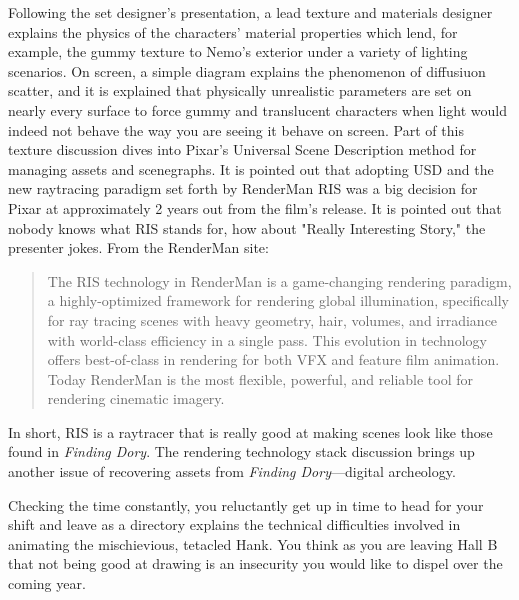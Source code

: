 \documentclass[../main.tex]{subfiles}
\begin{document}
Following the set designer's presentation, a lead texture and materials designer explains the physics of the characters' material properties which lend, for example, the gummy texture to Nemo's exterior under a variety of lighting scenarios. On screen, a simple diagram explains the phenomenon of diffusiuon scatter, and it is explained that physically unrealistic parameters are set on nearly every surface to force gummy and translucent characters when light would indeed not behave the way you are seeing it behave on screen. Part of this texture discussion dives into Pixar's Universal Scene Description method for managing assets and scenegraphs. It is pointed out that adopting USD and the new raytracing paradigm set forth by RenderMan RIS was a big decision for Pixar at approximately 2 years out from the film's release. It is pointed out that nobody knows what RIS stands for, how about "Really Interesting Story," the presenter jokes. From the RenderMan site:

\begin{quote}
The RIS technology in RenderMan is a game-changing rendering paradigm, a highly-optimized framework for rendering global illumination, specifically for ray tracing scenes with heavy geometry, hair, volumes, and irradiance with world-class efficiency in a single pass. This evolution in technology offers best-of-class in rendering for both VFX and feature film animation. Today RenderMan is the most flexible, powerful, and reliable tool for rendering cinematic imagery.  
\end{quote}

In short, RIS is a raytracer that is really good at making scenes look like those found in \textit{Finding Dory}. The rendering technology stack discussion brings up another issue of recovering assets from \textit{Finding Dory}---digital archeology.

Checking the time constantly, you reluctantly get up in time to head for your shift and leave as a directory explains the technical difficulties involved in animating the mischievious, tetacled Hank. You think as you are leaving Hall B that not being good at drawing is an insecurity you would like to dispel over the coming year.
\end{document}
